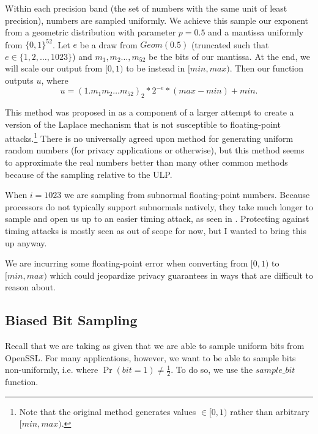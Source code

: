 \documentclass[11pt]{scrartcl} %
\begin{document}
Within each precision band (the set of numbers with the same unit
of least precision), numbers are sampled uniformly.
We achieve this sample our exponent from a geometric distribution with parameter $p = 0.5$ and a mantissa uniformly from $\{0,1\}^{52}$.
Let $e$ be a draw from $Geom(0.5)$ (truncated such that $e \in \{1,2,\hdots,1023\}$) and $m_1, m_2 \hdots, m_{52}$ be the bits of our mantissa.
At the end, we will scale our output from $[0,1)$ to be instead in $[min, max)$. Then our function outputs $u$, where
\[ u = (1.m_1m_2 \hdots m_{52})_2 * 2^{-e} * (max - min) + min. \]

This method was proposed in \cite{Mir12} as a component of a larger attempt to create
a version of the Laplace mechanism that is not susceptible to floating-point attacks.\footnote{Note that the
original method generates values $\in [0,1)$ rather than arbitrary $[min, max)$.}
There is no universally agreed upon method for generating uniform random numbers (for privacy
applications or otherwise), but this method seems to approximate the real numbers better than many
other common methods because of the sampling relative to the ULP. \newline

\begin{tcolorbox}[colback = {green}, title = {Known Privacy Issues}, colbacktitle = black]
	When $i=1023$ we are sampling from subnormal floating-point numbers. Because processors do not typically support
	subnormals natively, they take much longer to sample and open us up to an easier timing attack, as
	seen in \cite{AKM+15}.
	Protecting against timing attacks is mostly seen as out of scope for now, but I wanted
	to bring this up anyway. \newline

	We are incurring some floating-point error when converting from $[0,1)$ to $[min, max)$ which
	could jeopardize privacy guarantees in ways that are difficult to reason about.\cite{Mir12} \cite{Ilv19}
\end{tcolorbox}

\subsection{Biased Bit Sampling}
Recall that we are taking as given that we are able to sample uniform bits from OpenSSL.
For many applications, however, we want to be able to sample bits non-uniformly,
i.e. where $\Pr(bit = 1) \neq \frac{1}{2}$. To do so, we use the $sample\_bit$ function.
\end{document}
